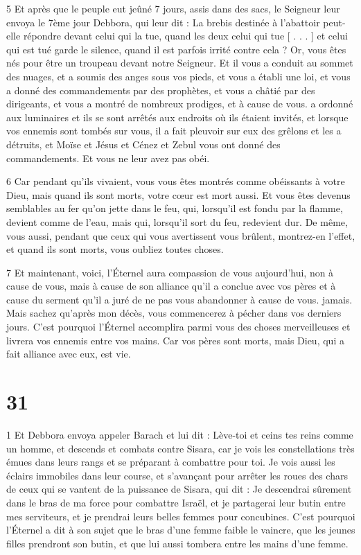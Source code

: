 \par 5 Et après que le peuple eut jeûné 7 jours, assis dans des sacs, le Seigneur leur envoya le 7ème jour Debbora, qui leur dit : La brebis destinée à l'abattoir peut-elle répondre devant celui qui la tue, quand les deux celui qui tue [ . . . ] et celui qui est tué garde le silence, quand il est parfois irrité contre cela ? Or, vous êtes nés pour être un troupeau devant notre Seigneur. Et il vous a conduit au sommet des nuages, et a soumis des anges sous vos pieds, et vous a établi une loi, et vous a donné des commandements par des prophètes, et vous a châtié par des dirigeants, et vous a montré de nombreux prodiges, et à cause de vous. a ordonné aux luminaires et ils se sont arrêtés aux endroits où ils étaient invités, et lorsque vos ennemis sont tombés sur vous, il a fait pleuvoir sur eux des grêlons et les a détruits, et Moïse et Jésus et Cénez et Zebul vous ont donné des commandements. Et vous ne leur avez pas obéi.

\par 6 Car pendant qu'ils vivaient, vous vous êtes montrés comme obéissants à votre Dieu, mais quand ils sont morts, votre cœur est mort aussi. Et vous êtes devenus semblables au fer qu'on jette dans le feu, qui, lorsqu'il est fondu par la flamme, devient comme de l'eau, mais qui, lorsqu'il sort du feu, redevient dur. De même, vous aussi, pendant que ceux qui vous avertissent vous brûlent, montrez-en l'effet, et quand ils sont morts, vous oubliez toutes choses.

\par 7 Et maintenant, voici, l'Éternel aura compassion de vous aujourd'hui, non à cause de vous, mais à cause de son alliance qu'il a conclue avec vos pères et à cause du serment qu'il a juré de ne pas vous abandonner à cause de vous. jamais. Mais sachez qu'après mon décès, vous commencerez à pécher dans vos derniers jours. C'est pourquoi l'Éternel accomplira parmi vous des choses merveilleuses et livrera vos ennemis entre vos mains. Car vos pères sont morts, mais Dieu, qui a fait alliance avec eux, est vie.

\chapter{31}

\par 1 Et Debbora envoya appeler Barach et lui dit : Lève-toi et ceins tes reins comme un homme, et descends et combats contre Sisara, car je vois les constellations très émues dans leurs rangs et se préparant à combattre pour toi. Je vois aussi les éclairs immobiles dans leur course, et s'avançant pour arrêter les roues des chars de ceux qui se vantent de la puissance de Sisara, qui dit : Je descendrai sûrement dans le bras de ma force pour combattre Israël, et je partagerai leur butin entre mes serviteurs, et je prendrai leurs belles femmes pour concubines. C'est pourquoi l'Éternel a dit à son sujet que le bras d'une femme faible le vaincre, que les jeunes filles prendront son butin, et que lui aussi tombera entre les mains d'une femme.


